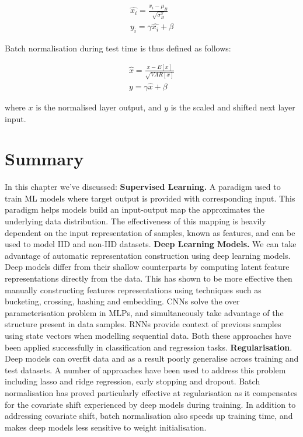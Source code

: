 \begin{subequations}
	\begin{gather}
		\hat{x_i} = \frac{x_i - \mu_B}{\sqrt{\sigma_B^2}} \\
		y_i = \gamma \hat{x_i} + \beta
	\end{gather}
\end{subequations}

Batch normalisation during test time is thus defined as follows:

\begin{subequations}
	\begin{gather}
		\hat{x} = \frac{x - E \left [ x \right ]}{\sqrt{VAR \left [ x \right ]}} \\
		y = \gamma \hat{x} + \beta
	\end{gather}
\end{subequations}

where $x$ is the normalised layer output, and $y$ is the scaled and shifted next layer input. 



\section{Summary}

In this chapter we've discussed: \newline
\textbf{Supervised Learning.} A paradigm used to train ML models where target output is provided with corresponding input. This paradigm helps models build an input-output map the approximates the underlying data distribution. The effectiveness of this mapping is heavily dependent on the input representation of samples, known as features, and can be used to model IID and non-IID datasets. \newline
\textbf{Deep Learning Models.} We can take advantage of automatic representation construction using deep learning models. Deep models differ from their shallow counterparts by computing latent feature representations directly from the data. This has shown to be more effective then manually constructing features representations using techniques such as bucketing, crossing, hashing and embedding. CNNs solve the over parameterisation problem in MLPs, and simultaneously take advantage of the structure present in data samples. RNNs provide context of previous samples using state vectors when modelling sequential data. Both these approaches have been applied successfully in classification and regression tasks. \newline
\textbf{Regularisation}. Deep models can overfit data and as a result poorly generalise across training and test datasets. A number of approaches have been used to address this problem including lasso and ridge regression, early stopping and dropout. Batch normalisation has proved particularly effective at regularisation as it compensates for the covariate shift experienced by deep models during training. In addition to addressing covariate shift, batch normalisation also speeds up training time, and makes deep models less sensitive to weight initialisation.
